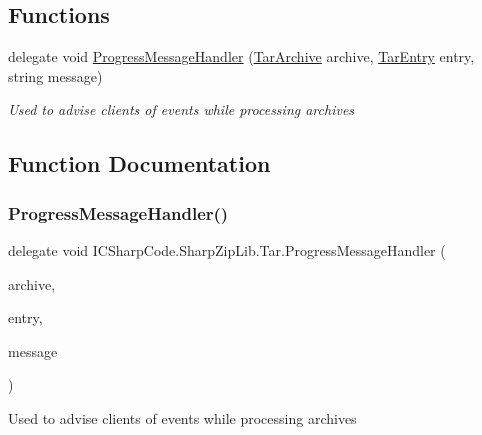 \subsection*{Functions}
\begin{DoxyCompactItemize}
\item 
delegate void \hyperlink{namespace_i_c_sharp_code_1_1_sharp_zip_lib_1_1_tar_aceffb334332f726e9d8619ddf6e3bf96}{Progress\+Message\+Handler} (\hyperlink{class_i_c_sharp_code_1_1_sharp_zip_lib_1_1_tar_1_1_tar_archive}{Tar\+Archive} archive, \hyperlink{class_i_c_sharp_code_1_1_sharp_zip_lib_1_1_tar_1_1_tar_entry}{Tar\+Entry} entry, string message)
\begin{DoxyCompactList}\small\item\em Used to advise clients of \textquotesingle{}events\textquotesingle{} while processing archives \end{DoxyCompactList}\end{DoxyCompactItemize}


\subsection{Function Documentation}
\mbox{\label{namespace_i_c_sharp_code_1_1_sharp_zip_lib_1_1_tar_aceffb334332f726e9d8619ddf6e3bf96}} 
\subsubsection{\texorpdfstring{Progress\+Message\+Handler()}{ProgressMessageHandler()}}
{\footnotesize\ttfamily delegate void I\+C\+Sharp\+Code.\+Sharp\+Zip\+Lib.\+Tar.\+Progress\+Message\+Handler (\begin{DoxyParamCaption}\item[{\hyperlink{class_i_c_sharp_code_1_1_sharp_zip_lib_1_1_tar_1_1_tar_archive}{Tar\+Archive}}]{archive,  }\item[{\hyperlink{class_i_c_sharp_code_1_1_sharp_zip_lib_1_1_tar_1_1_tar_entry}{Tar\+Entry}}]{entry,  }\item[{string}]{message }\end{DoxyParamCaption})}



Used to advise clients of \textquotesingle{}events\textquotesingle{} while processing archives 

